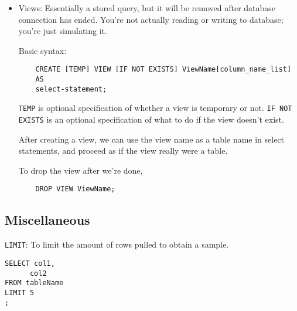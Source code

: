 \documentclass[12pt]{article}
\theoremstyle{plain}
\theoremstyle{definition}
\theoremstyle{remark}
\begin{document}
\begin{itemize}
  \item Views:
    Essentially a stored query, but it will be removed after database
    connection has ended. You're not actually reading or writing to
    database; you're just simulating it.

    Basic syntax:
    \begin{lstlisting}
    CREATE [TEMP] VIEW [IF NOT EXISTS] ViewName[column_name_list]
    AS
    select-statement;
    \end{lstlisting}
    \texttt{TEMP} is optional specification of whether a view is
    temporary or not. \texttt{IF NOT EXISTS} is an optional
    specification of what to do if the view doesn't exist.

    After creating a view, we can use the view name as a table name in
    select statements, and proceed as if the view really were a table.

    To drop the view after we're done,
    \begin{lstlisting}
    DROP VIEW ViewName;
    \end{lstlisting}

\end{itemize}



\subsection{Miscellaneous}

\texttt{LIMIT}:
To limit the amount of rows pulled to obtain a sample.
\begin{lstlisting}
SELECT col1,
      col2
FROM tableName
LIMIT 5
;
\end{lstlisting}
\end{document}
